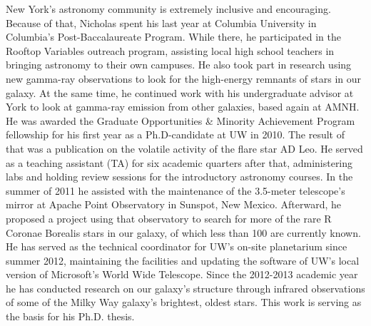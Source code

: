 \documentclass[12pt]{article}
\begin{document}
New York's astronomy community is extremely inclusive and encouraging. Because of that, Nicholas spent his last year at Columbia University in Columbia's Post-Baccalaureate Program. While there, he participated in the Rooftop Variables outreach program, assisting local high school teachers in bringing astronomy to their own campuses. He also took part in research using new gamma-ray observations to look for the high-energy remnants of stars in our galaxy. At the same time, he continued work with his undergraduate advisor at York to look at gamma-ray emission from other galaxies, based again at AMNH.\\

He was awarded the Graduate Opportunities \& Minority Achievement Program fellowship for his first year as a Ph.D-candidate at UW in 2010. The result of that was a publication on the volatile activity of the flare star AD Leo. He served as a teaching assistant (TA) for six academic quarters after that, administering labs and holding review sessions for the introductory astronomy courses. In the summer of 2011 he assisted with the maintenance of the 3.5-meter telescope's mirror at Apache Point Observatory in Sunspot, New Mexico. Afterward, he proposed a project using that observatory to search for more of the rare R Coronae Borealis stars in our galaxy, of which less than 100 are currently known. He has served as the technical coordinator for UW's on-site planetarium since summer 2012, maintaining the facilities and updating the software of UW's local version of Microsoft's World Wide Telescope. Since the 2012-2013 academic year he has conducted research on our galaxy's structure through infrared observations of some of the Milky Way galaxy's brightest, oldest stars. This work is serving as the basis for his Ph.D. thesis.\\
\end{document}
